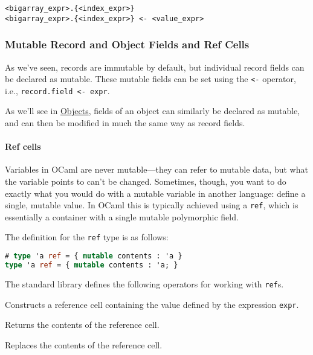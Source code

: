 \begin{lstlisting}
<bigarray_expr>.{<index_expr>}
<bigarray_expr>.{<index_expr>} <- <value_expr>
\end{lstlisting}

\hypertarget{mutable-record-and-object-fields-and-ref-cells}{%
\subsubsection{Mutable Record and Object Fields and Ref
Cells}\label{mutable-record-and-object-fields-and-ref-cells}}

As we've seen, records are immutable by default, but individual record
fields can be declared as mutable. These mutable fields can be set using
the \passthrough{\lstinline!<-!} operator, i.e.,
\passthrough{\lstinline!record.field <- expr!}.

As we'll see in \href{objects.html\#objects}{Objects}, fields of an
object can similarly be declared as mutable, and can then be modified in
much the same way as record fields.

\hypertarget{ref-cells}{%
\paragraph{Ref cells}\label{ref-cells}}

Variables in OCaml are never mutable---they can refer to mutable data,
but what the variable points to can't be changed. Sometimes, though, you
want to do exactly what you would do with a mutable variable in another
language: define a single, mutable value. In OCaml this is typically
achieved using a \passthrough{\lstinline!ref!}, which is essentially a
container with a single mutable polymorphic field. 

The definition for the \passthrough{\lstinline!ref!} type is as follows:

\begin{lstlisting}[language=Caml]
# type 'a ref = { mutable contents : 'a }
type 'a ref = { mutable contents : 'a; }
\end{lstlisting}

The standard library defines the following operators for working with
\passthrough{\lstinline!ref!}s.

\begin{description}
\tightlist
\item[\texttt{ref\ expr}]
Constructs a reference cell containing the value defined by the
expression \passthrough{\lstinline!expr!}.
\item[\texttt{!refcell}]
Returns the contents of the reference cell.
\item[\texttt{refcell\ :=\ expr}]
Replaces the contents of the reference cell.
\end{description}

